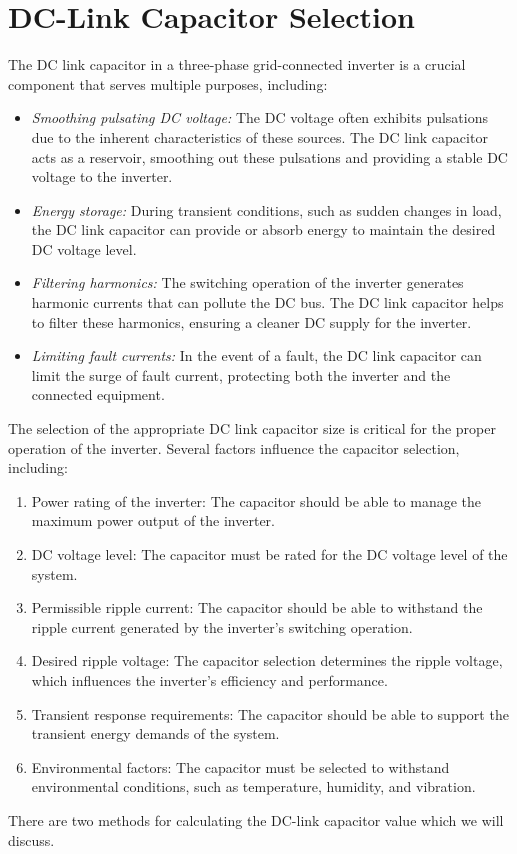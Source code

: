 \documentclass[12pt,a4paper]{book}
\begin{document}
\section{DC-Link Capacitor Selection}
The DC link capacitor in a three-phase grid-connected inverter is a crucial component that serves multiple purposes, including:
\begin{itemize}
  \item \emph{Smoothing pulsating DC voltage:} The DC voltage often exhibits pulsations due to the inherent characteristics of these sources. The DC link capacitor acts as a reservoir, smoothing out these pulsations and providing a stable DC voltage to the inverter.
  \item \emph{Energy storage:} During transient conditions, such as sudden changes in load, the DC link capacitor can provide or absorb energy to maintain the desired DC voltage level.
  \item \emph{Filtering harmonics:} The switching operation of the inverter generates harmonic currents that can pollute the DC bus. The DC link capacitor helps to filter these harmonics, ensuring a cleaner DC supply for the inverter.
  \item \emph{Limiting fault currents:} In the event of a fault, the DC link capacitor can limit the surge of fault current, protecting both the inverter and the connected equipment.
\end{itemize}
The selection of the appropriate DC link capacitor size is critical for the proper operation of the inverter. Several factors influence the capacitor selection, including:
\begin{enumerate}
  \item Power rating of the inverter: The capacitor should be able to manage the maximum power output of the inverter.
  \item DC voltage level: The capacitor must be rated for the DC voltage level of the system.
  \item Permissible ripple current: The capacitor should be able to withstand the ripple current generated by the inverter's switching operation.
  \item Desired ripple voltage: The capacitor selection determines the ripple voltage, which influences the inverter's efficiency and performance.
  \item Transient response requirements: The capacitor should be able to support the transient energy demands of the system.
  \item Environmental factors: The capacitor must be selected to withstand environmental conditions, such as temperature, humidity, and vibration.
\end{enumerate}
There are two methods for calculating the DC-link capacitor value which we will discuss.
\end{document}
